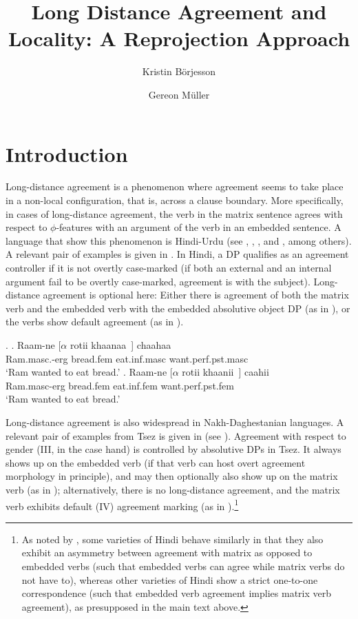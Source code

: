 \documentclass[output=paper
,modfonts
,nonflat]{langsci/langscibook}
\title{Long Distance Agreement and Locality: A Reprojection Approach}
\author{Kristin B\"orjesson\affiliation{Universit{\"a}t Leipzig}\and Gereon M\"uller\affiliation{Universit\"at Leipzig}}
\begin{document}
\maketitle


\section{Introduction}

Long-distance agreement is a phenomenon where agreement seems to take
place in a non-local configuration, that is, across a clause boundary.
More specifically, in cases of long-distance agreement, the verb in
the matrix sentence agrees with respect to $\phi$-features with an
argument of the verb in an embedded sentence. A language that show
this phenomenon is Hindi-Urdu (see \cite{Mahajan:90},
\cite{Butt:95,Butt:08}, \cite{Bhatt:05}, and \cite{Chandra:05}, among
others). A relevant pair of examples is given in \Next. In Hindi, a DP
qualifies as an agreement controller if it is not overtly case-marked (if
both an external and an internal argument fail to be overtly
case-marked, agreement is with the subject). Long-distance agreement
is optional here: Either there is agreement of both the matrix verb
and the embedded verb with the embedded absolutive object DP (as in
\Next[b]), or the verbs show default agreement (as in \Next[a]).

\Lsciexi.  \label{1}
 \ag.  Raam-ne [$\alpha$ rotii khaanaa~] chaahaa \\ 
      Ram.{\sc masc}.-{\sc erg} {} bread.{\sc fem} eat.{\sc inf}.{\sc masc} want.{\sc perf.pst.masc} \\ 
 \trans      `Ram wanted to eat bread.'
\bg.  Raam-ne [$\alpha$ rotii khaanii~] caahii \\ 
      Ram.{\sc masc}-{\sc erg} {} bread.{\sc fem} eat.{\sc inf}.{\sc fem} want.{\sc perf.pst.fem} \\ 
\trans `Ram wanted to eat bread.'

Long-distance agreement is also widespread in Nakh-Daghestanian
languages. A relevant pair of examples from Tsez is given in \Next
(see \cite{Polinsky&Potsdam:01}). Agreement with respect to gender
(III, in the case hand) is controlled by
absolutive DPs in Tsez. It always shows up on the embedded verb (if
that verb can host overt agreement morphology in principle), and may
then optionally also show up on the matrix verb (as in \Next[b]);
alternatively, there is no long-distance agreement, and the matrix
verb exhibits default (IV) agreement marking (as in \Next[a]).\footnote{As
  noted by \cite{Bhatt:05}, some varieties of Hindi behave similarly
  in that they also exhibit an asymmetry between agreement with matrix
  as opposed to embedded verbs (such that embedded verbs can agree
  while matrix verbs do not have to), whereas other varieties of Hindi show a
  strict one-to-one correspondence (such that embedded verb agreement
  implies matrix verb agreement), as presupposed in the main text above.}
\end{document}
